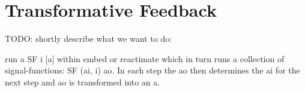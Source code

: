 \section{Transformative Feedback}
TODO: shortly describe what we want to do:

run a SF i [a] within embed or reactimate which in turn runs a collection of signal-functions: SF (ai, i) ao. In each step the ao then determines the ai for the next step and ao is transformed into an a.
